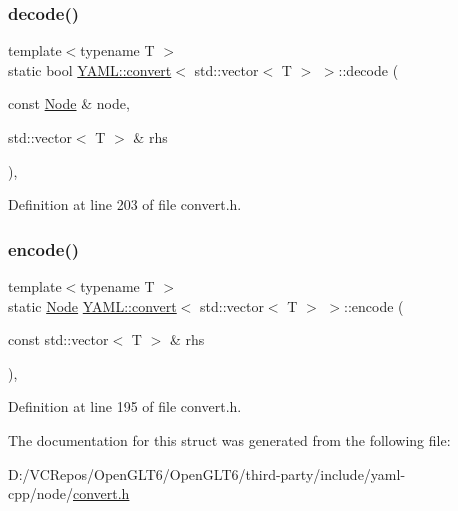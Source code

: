 \subsubsection{\texorpdfstring{decode()}{decode()}}
{\footnotesize\ttfamily template$<$typename T $>$ \\
static bool \mbox{\hyperlink{struct_y_a_m_l_1_1convert}{Y\+A\+M\+L\+::convert}}$<$ std\+::vector$<$ T $>$ $>$\+::decode (\begin{DoxyParamCaption}\item[{const \mbox{\hyperlink{class_y_a_m_l_1_1_node}{Node}} \&}]{node,  }\item[{std\+::vector$<$ T $>$ \&}]{rhs }\end{DoxyParamCaption})\hspace{0.3cm}{\ttfamily [inline]}, {\ttfamily [static]}}



Definition at line 203 of file convert.\+h.

\mbox{\label{struct_y_a_m_l_1_1convert_3_01std_1_1vector_3_01_t_01_4_01_4_ac4d16f5ef721ee76356b537dbffe0737}} 
\subsubsection{\texorpdfstring{encode()}{encode()}}
{\footnotesize\ttfamily template$<$typename T $>$ \\
static \mbox{\hyperlink{class_y_a_m_l_1_1_node}{Node}} \mbox{\hyperlink{struct_y_a_m_l_1_1convert}{Y\+A\+M\+L\+::convert}}$<$ std\+::vector$<$ T $>$ $>$\+::encode (\begin{DoxyParamCaption}\item[{const std\+::vector$<$ T $>$ \&}]{rhs }\end{DoxyParamCaption})\hspace{0.3cm}{\ttfamily [inline]}, {\ttfamily [static]}}



Definition at line 195 of file convert.\+h.



The documentation for this struct was generated from the following file\+:\begin{DoxyCompactItemize}
\item 
D\+:/\+V\+C\+Repos/\+Open\+G\+L\+T6/\+Open\+G\+L\+T6/third-\/party/include/yaml-\/cpp/node/\mbox{\hyperlink{convert_8h}{convert.\+h}}\end{DoxyCompactItemize}
